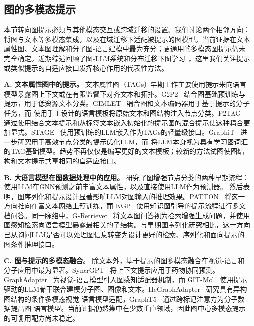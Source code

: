 \subsection{图的多模态提示}\label{sec:multi_modal}

本节转向图提示必须与其他模态交互或跨域迁移的设置。我们讨论两个相邻方向：将图与文本等多模态集成，以及在域迁移下适配被提示的图模型。当前证据在文本属性图、文本图理解和分子图-语言建模中最为充分；更通用的多模态图提示仍未完全确定。近期综述回顾了图-LLM系统和分布迁移下图学习~\cite{ren2024surveyllmgraph,wu2024graphshifts,shi2024graphdomain}。这里我们关注提示或类似提示的自适应接口发挥核心作用的代表性方法。




\textbf{A. 文本属性图中的提示。} 文本属性图（TAGs）早期工作主要使用提示来向语言模型暴露图上下文或在有限监督下对齐文本和拓扑。G2P2~\cite{wen2023augmenting} 结合图基础预训练与提示，用于低资源文本分类。GIMLET~\cite{zhao2023gimlet} 耦合图和文本编码器用于基于提示的分子任务，而 \citet{li2023promptbased} 使用手工设计的语言模板将原始文本和图结构注入节点分类。P2TAG~\cite{zhao2024p2tag} 通过使用结合文本提示和从标签文本嵌入初始化的提示图的混合提示使这种耦合更加显式。STAGE~\cite{zolnai2024stage} 使用预训练的LLM嵌入作为TAGs的轻量级接口。GraphiT~\cite{khoshraftar2025graphit} 进一步研究用于高效节点分类的提示优化LLM，而 \citet{zhu2025llmasgnn} 将LLM本身视为具有学习图词汇的TAG基础模型。趋势不再仅仅是编写更好的文本模板；较新的方法试图使图结构和文本提示共享相同的自适应接口。


\textbf{B. 大语言模型在图数据处理中的应用。}
\citet{chen2023exploring} 研究了图增强节点分类的两种早期流程：使用LLM在GNN预测之前丰富文本属性，以及直接使用LLM作为预测器。\citet{fatemi2023talk} 然后表明，图序列化和提示设计显著影响LLM对图输入的推理效果。PATTON~\cite{jin2023patton} 将这一方向推向在富文本网络上预训练，而 KGP~\cite{wang2023knowledge} 使用知识图引导的提示流程进行多文档问答。同一脉络中，G-Retriever~\cite{he2024gretriever} 将文本图问答视为检索增强生成问题，并使用图感知检索向语言模型暴露最相关的子结构。与早期图序列化研究相比，这一方向已从询问LLM是否可以处理图信息转变为设计更好的检索、序列化和面向提示的图条件推理接口。





\textbf{C. 图与提示的多模态融合。}
除文本外，基于提示的图多模态融合在视觉-语言和分子应用中最为显著。SynerGPT~\cite{edwards2023synergpt} 将上下文提示应用于药物协同预测。GraphAdapter~\cite{li2023graphadapter} 为视觉-语言模型引入图感知适配器机制，而 GIT-Mol~\cite{liu2023gitmol} 使用提示驱动的LLM骨干联合建模分子图、图像和文本。HeGraphAdapter~\cite{zhao2024hegraphadapter} 研究具有异构图结构的条件多模态视觉-语言模型适配，GraphT5~\cite{kim2025grapht5} 通过跨标记注意力为分子数据提出图-语言模型。当前证据仍然集中在少数垂直领域，因此图中心多模态提示的可复用配方尚未稳定。


